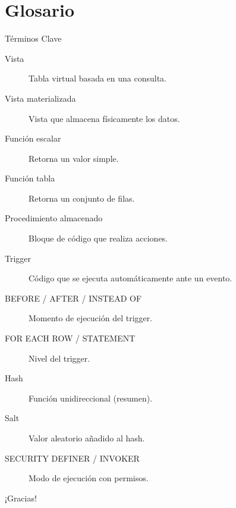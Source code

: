 \documentclass[aspectratio=169, 10pt, xcolor=table]{beamer}
\begin{document}
\section{Glosario}

\begin{frame}{Términos Clave}
    \begin{description}
        \item[Vista] Tabla virtual basada en una consulta.
        \item[Vista materializada] Vista que almacena físicamente los datos.
        \item[Función escalar] Retorna un valor simple.
        \item[Función tabla] Retorna un conjunto de filas.
        \item[Procedimiento almacenado] Bloque de código que realiza acciones.
        \item[Trigger] Código que se ejecuta automáticamente ante un evento.
        \item[BEFORE / AFTER / INSTEAD OF] Momento de ejecución del trigger.
        \item[FOR EACH ROW / STATEMENT] Nivel del trigger.
        \item[Hash] Función unidireccional (resumen).
        \item[Salt] Valor aleatorio añadido al hash.
        \item[SECURITY DEFINER / INVOKER] Modo de ejecución con permisos.
    \end{description}
\end{frame}

\begin{frame}
    \centering

    
    \vspace{1cm}
    \large ¡Gracias!
\end{frame}
\end{document}
